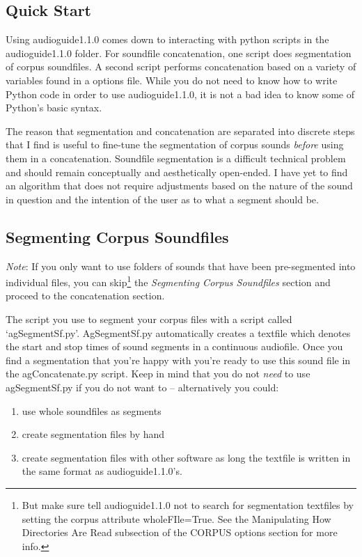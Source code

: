 \documentclass{article}
\newcommand{\ag}{audioguide1.1.0\xspace}
\begin{document}
\begin{spacing}{1.2}
  


\section{Quick Start}
Using \ag comes down to interacting with python scripts in the \ag folder.  For soundfile concatenation, one script does segmentation of corpus soundfiles.  A second script performs concatenation based on a variety of variables found in a options file.  While you do not need to know how to write Python code in order to use \ag, it is not a bad idea to know some of Python's basic syntax.

The reason that segmentation and concatenation are separated into discrete steps that I find is useful to fine-tune the segmentation of corpus sounds \emph{before} using them in a concatenation.  Soundfile segmentation is a difficult technical problem and should remain conceptually and aesthetically open-ended.  I have yet to find an algorithm that does not require adjustments based on the nature of the sound in question and the intention of the user as to what a segment should be.


\subsection{Segmenting Corpus Soundfiles}
\emph{Note}: If you only want to use folders of sounds that have been pre-segmented into individual files, you can skip\footnote{But make sure tell \ag not to search for segmentation textfiles by setting the corpus attribute wholeFIle=True.  See the Manipulating How Directories Are Read subsection of the CORPUS options section for more info.} the \emph{Segmenting Corpus Soundfiles} section and proceed to the concatenation section.

The script you use to segment your corpus files with a script called `agSegmentSf.py'.  AgSegmentSf.py automatically creates a textfile which denotes the start and stop times of sound segments in a continuous audiofile.  Once you find a segmentation that you're happy with you're ready to use this sound file in the agConcatenate.py script.
Keep in mind that you do not \emph{need} to use agSegmentSf.py if you do not want to -- alternatively you could:
\begin{enumerate}
\item use whole soundfiles as segments
\item create segmentation files by hand
\item create segmentation files with other software as long the textfile is written in the same format as \ag's.
\end{enumerate}


\end{spacing}
\end{document}
